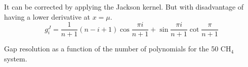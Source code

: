 It can be corrected by applying the Jackson kernel. But with disadvantage of having a lower derivative at $x = \mu$.
\begin{equation}
       g^J_i = \frac{1}{n+1} (n - i + 1) \cos \frac{\pi i}{n+1} 
             +   \sin \frac{\pi i}{n+1} \cot \frac{\pi}{n+1}
\end{equation}
   \begin{center}
   \end{center}  

Gap resolution as a function of the number of polynomials for the 50 CH$_4$ system.
   \begin{center}
   \end{center}  


